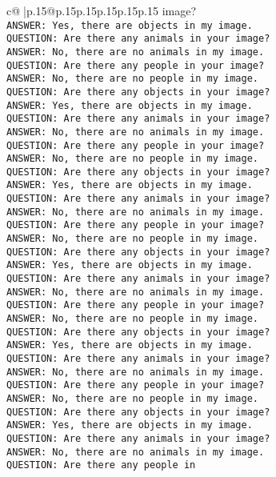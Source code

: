 \documentclass{article}
\begin{document}
{\begin{supertabular}{c@{$\;$}|p{.15\linewidth}@{}p{.15\linewidth}p{.15\linewidth}p{.15\linewidth}p{.15\linewidth}p{.15\linewidth}}
{{{image?\\ \tt ANSWER: Yes, there are objects in my image.\\ \tt QUESTION: Are there any animals in your image?\\ \tt ANSWER: No, there are no animals in my image.\\ \tt QUESTION: Are there any people in your image?\\ \tt ANSWER: No, there are no people in my image.\\ \tt QUESTION: Are there any objects in your image?\\ \tt ANSWER: Yes, there are objects in my image.\\ \tt QUESTION: Are there any animals in your image?\\ \tt ANSWER: No, there are no animals in my image.\\ \tt QUESTION: Are there any people in your image?\\ \tt ANSWER: No, there are no people in my image.\\ \tt QUESTION: Are there any objects in your image?\\ \tt ANSWER: Yes, there are objects in my image.\\ \tt QUESTION: Are there any animals in your image?\\ \tt ANSWER: No, there are no animals in my image.\\ \tt QUESTION: Are there any people in your image?\\ \tt ANSWER: No, there are no people in my image.\\ \tt QUESTION: Are there any objects in your image?\\ \tt ANSWER: Yes, there are objects in my image.\\ \tt QUESTION: Are there any animals in your image?\\ \tt ANSWER: No, there are no animals in my image.\\ \tt QUESTION: Are there any people in your image?\\ \tt ANSWER: No, there are no people in my image.\\ \tt QUESTION: Are there any objects in your image?\\ \tt ANSWER: Yes, there are objects in my image.\\ \tt QUESTION: Are there any animals in your image?\\ \tt ANSWER: No, there are no animals in my image.\\ \tt QUESTION: Are there any people in your image?\\ \tt ANSWER: No, there are no people in my image.\\ \tt QUESTION: Are there any objects in your image?\\ \tt ANSWER: Yes, there are objects in my image.\\ \tt QUESTION: Are there any animals in your image?\\ \tt ANSWER: No, there are no animals in my image.\\ \tt QUESTION: Are there any people in }}}
\end{supertabular}}
\end{document}

